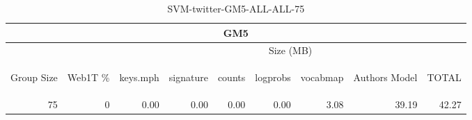 \begin{center}
\begin{table}[htbp] 
 \begin{center}
\begin{tabular}{ | r | r | r | r | r | r | r | r | r |}
\hline
\multicolumn{9}{|c|}{GM5}\\
\hline
 & & \multicolumn{7}{|c|}{Size (MB)}\\ \cline{3-9}
\begin{sideways}Group Size\end{sideways} & \begin{sideways}Web1T \% \end{sideways} & \begin{sideways}keys.mph\end{sideways} & \begin{sideways}signature\end{sideways} & \begin{sideways}counts\end{sideways} & \begin{sideways}logprobs\end{sideways} & \begin{sideways}vocabmap\end{sideways} & \begin{sideways}Authors Model \end{sideways} & \begin{sideways}TOTAL\end{sideways}\\
\hline
\multirow{0}{*}{75}
 & 0 & 0.00 & 0.00 & 0.00 & 0.00 & 3.08 & 39.19 & 42.27\\ \cline{2-9}
\hline
\end{tabular}
\caption{SVM-twitter-GM5-ALL-ALL-75}
\label{table:SVM-twitter-GM5-ALL-ALL-75}
\end{center}
 \end{table}
\end{center}

